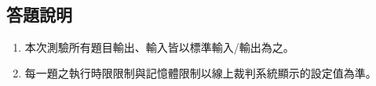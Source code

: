 \thispagestyle{empty}
\setcounter{page}{-1}

\vspace*{4em}

\begin{center}
{\bfseries\Huge{\ContestName{}}}\\
\end{center}
\begin{center}
{\bfseries\LARGE{\ContestDate{}}}
\end{center}

\vspace*{2em}
\subsection*{答題說明}

{\large
\begin{enumerate}
\item 本次測驗所有題目輸出、輸入皆以標準輸入/輸出為之。
\item 每一題之執行時限限制與記憶體限制以線上裁判系統顯示的設定值為準。
\end{enumerate}
}

\vspace*{2em}
\begin{center}
\end{center}

\newpage

\thispagestyle{empty}
\EmptyPageHint{}
\newpage
